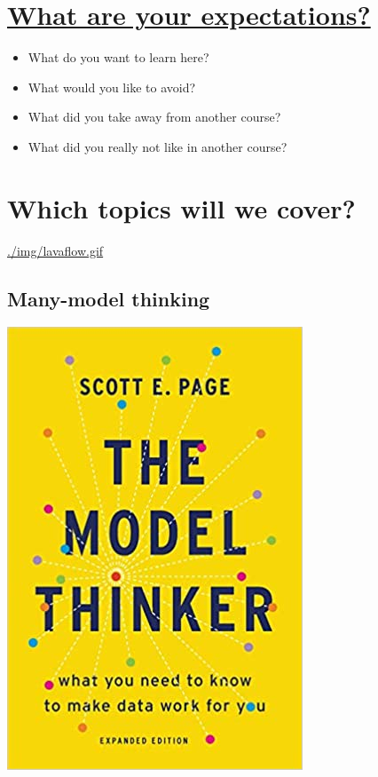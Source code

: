 \documentclass[11pt]{article}
\begin{document}
\section*{\href{https://ideaboardz.com/for/Data\%20modeling\%20expectations/4047934}{What are your expectations?}}
\label{sec:org17238e9}

\begin{itemize}
\item What do you want to learn here?
\item What would you like to avoid?
\item What did you take away from another course?
\item What did you really not like in another course?
\end{itemize}

\section*{Which topics will we cover?}
\label{sec:org96174ca}

\url{./img/lavaflow.gif}

\subsection*{Many-model thinking}
\label{sec:org2c38e14}

\begin{center}
\includegraphics[width=.9\linewidth]{./img/pagebook.jpg}
\end{center}
\end{document}
